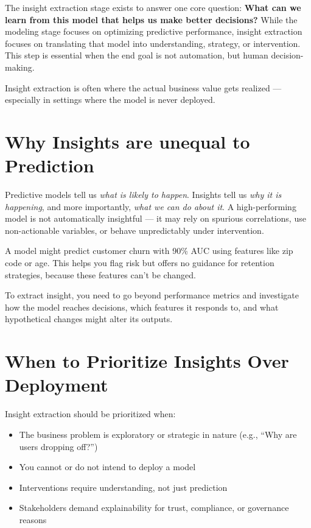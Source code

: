 \documentclass[12pt,openany]{book}
\begin{document}
The insight extraction stage exists to answer one core question: \textbf{What can we learn from this model that helps us make better decisions?} While the modeling stage focuses on optimizing predictive performance, insight extraction focuses on translating that model into understanding, strategy, or intervention. This step is essential when the end goal is not automation, but human decision-making.

\begin{notebox}
Insight extraction is often where the actual business value gets realized — especially in settings where the model is never deployed.
\end{notebox}

\section{Why Insights are unequal to Prediction}

Predictive models tell us \emph{what is likely to happen}. Insights tell us \emph{why it is happening}, and more importantly, \emph{what we can do about it}. A high-performing model is not automatically insightful — it may rely on spurious correlations, use non-actionable variables, or behave unpredictably under intervention.

\begin{examplebox}
A model might predict customer churn with 90\% AUC using features like zip code or age. This helps you flag risk but offers no guidance for retention strategies, because these features can’t be changed.
\end{examplebox}

To extract insight, you need to go beyond performance metrics and investigate how the model reaches decisions, which features it responds to, and what hypothetical changes might alter its outputs.

\section{When to Prioritize Insights Over Deployment}

Insight extraction should be prioritized when:
\begin{itemize}
  \item The business problem is exploratory or strategic in nature (e.g., ``Why are users dropping off?'')
  \item You cannot or do not intend to deploy a model
  \item Interventions require understanding, not just prediction
  \item Stakeholders demand explainability for trust, compliance, or governance reasons
\end{itemize}
\end{document}
